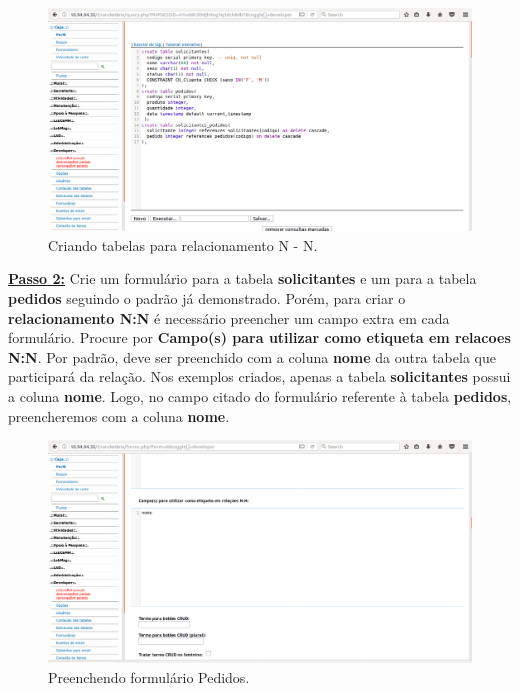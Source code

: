 \documentclass[9pt]{report}
\begin{document}
{       \begin{figure}[H]
        \includegraphics[width=\textwidth]{2_Formularios/4_Relacionamento_N_N/38.png}
        \caption{Criando tabelas para relacionamento N - N.}
        \label{fig:tabelasNN}
       \end{figure}

       \underline{\textbf{Passo 2:}} Crie um formulário para a tabela
       \textbf{solicitantes} e um para a tabela \textbf{pedidos}
       seguindo o padrão já demonstrado. Porém, para criar o
       \textbf{relacionamento N:N} é necessário preencher um campo
       extra em cada formulário. Procure por
       \textbf{Campo(s) para utilizar como etiqueta em relacoes N:N}.
       Por padrão, deve ser preenchido com a coluna \textbf{nome} da
       outra tabela que participará da relação. Nos exemplos criados,
       apenas a tabela \textbf{solicitantes} possui a coluna
       \textbf{nome}. Logo, no campo citado do formulário referente à
       tabela \textbf{pedidos}, preencheremos com a coluna
       \textbf{nome}.
       
       \begin{figure}[H]
        \includegraphics[width=\textwidth]{2_Formularios/4_Relacionamento_N_N/39.png}
        \caption{Preenchendo formulário Pedidos.}
        \label{fig:formpedidosNN}
       \end{figure}

}
\end{document}
